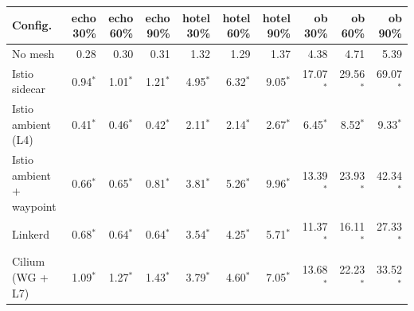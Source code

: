 \begin{tabular}{lrrrrrrrrr}
\toprule
Config. & echo 30\% & echo 60\% & echo 90\% & hotel 30\% & hotel 60\% & hotel 90\% & ob 30\% & ob 60\% & ob 90\% \\
\midrule
No mesh & 0.28 & 0.30 & 0.31 & 1.32 & 1.29 & 1.37 & 4.38 & 4.71 & 5.39 \\
Istio sidecar & 0.94$^{*}$ & 1.01$^{*}$ & 1.21$^{*}$ & 4.95$^{*}$ & 6.32$^{*}$ & 9.05$^{*}$ & 17.07$^{*}$ & 29.56$^{*}$ & 69.07$^{*}$ \\
Istio ambient (L4) & 0.41$^{*}$ & 0.46$^{*}$ & 0.42$^{*}$ & 2.11$^{*}$ & 2.14$^{*}$ & 2.67$^{*}$ & 6.45$^{*}$ & 8.52$^{*}$ & 9.33$^{*}$ \\
Istio ambient + waypoint & 0.66$^{*}$ & 0.65$^{*}$ & 0.81$^{*}$ & 3.81$^{*}$ & 5.26$^{*}$ & 9.96$^{*}$ & 13.39$^{*}$ & 23.93$^{*}$ & 42.34$^{*}$ \\
Linkerd & 0.68$^{*}$ & 0.64$^{*}$ & 0.64$^{*}$ & 3.54$^{*}$ & 4.25$^{*}$ & 5.71$^{*}$ & 11.37$^{*}$ & 16.11$^{*}$ & 27.33$^{*}$ \\
Cilium (WG + L7) & 1.09$^{*}$ & 1.27$^{*}$ & 1.43$^{*}$ & 3.79$^{*}$ & 4.60$^{*}$ & 7.05$^{*}$ & 13.68$^{*}$ & 22.23$^{*}$ & 33.52$^{*}$ \\
\bottomrule
\end{tabular}

